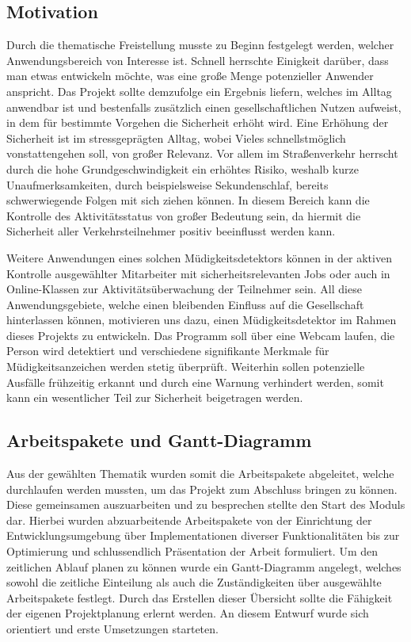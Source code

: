 \subsection{Motivation}
Durch die thematische Freistellung musste zu Beginn festgelegt werden, welcher Anwendungsbereich von Interesse ist. Schnell herrschte Einigkeit darüber, dass man etwas entwickeln möchte, was eine große Menge potenzieller Anwender anspricht. Das Projekt sollte demzufolge ein Ergebnis liefern, welches im Alltag anwendbar ist und bestenfalls zusätzlich einen gesellschaftlichen Nutzen aufweist, in dem für bestimmte Vorgehen die Sicherheit erhöht wird. Eine Erhöhung der Sicherheit ist im stressgeprägten Alltag, wobei Vieles schnellstmöglich vonstattengehen soll, von großer Relevanz. Vor allem im Straßenverkehr herrscht durch die hohe Grundgeschwindigkeit ein erhöhtes Risiko, weshalb kurze Unaufmerksamkeiten, durch beispielsweise Sekundenschlaf, bereits schwerwiegende Folgen mit sich ziehen können. In diesem Bereich kann die Kontrolle des Aktivitätsstatus von großer Bedeutung sein, da hiermit die Sicherheit aller Verkehrsteilnehmer positiv beeinflusst werden kann. 

Weitere Anwendungen eines solchen Müdigkeitsdetektors können in der aktiven Kontrolle ausgewählter Mitarbeiter mit sicherheitsrelevanten Jobs oder auch in Online-Klassen zur Aktivitätsüberwachung der Teilnehmer sein. All diese Anwendungsgebiete, welche einen bleibenden Einfluss auf die Gesellschaft hinterlassen können, motivieren uns dazu, einen Müdigkeitsdetektor im Rahmen dieses Projekts zu entwickeln. Das Programm soll über eine Webcam laufen, die Person wird detektiert und verschiedene signifikante Merkmale für Müdigkeitsanzeichen werden stetig überprüft. Weiterhin sollen potenzielle Ausfälle frühzeitig erkannt und durch eine Warnung verhindert werden, somit kann ein wesentlicher Teil zur Sicherheit beigetragen werden.

\subsection{Arbeitspakete und Gantt-Diagramm}
Aus der gewählten Thematik wurden somit die Arbeitspakete abgeleitet, welche durchlaufen werden mussten, um das Projekt zum Abschluss bringen zu können. Diese gemeinsamen auszuarbeiten und zu besprechen stellte den Start des Moduls dar. Hierbei wurden abzuarbeitende Arbeitspakete von der Einrichtung der Entwicklungsumgebung über Implementationen diverser Funktionalitäten bis zur Optimierung und schlussendlich Präsentation der Arbeit formuliert. Um den zeitlichen Ablauf planen zu können wurde ein Gantt-Diagramm angelegt, welches sowohl die zeitliche Einteilung als auch die Zuständigkeiten über ausgewählte Arbeitspakete festlegt. Durch das Erstellen dieser Übersicht sollte die Fähigkeit der eigenen Projektplanung erlernt werden. An diesem Entwurf wurde sich orientiert und erste Umsetzungen starteten.
